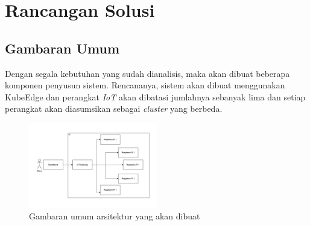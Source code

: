 \section{Rancangan Solusi}
\label{sec:rancangan-solusi}

\subsection{Gambaran Umum}
Dengan segala kebutuhan yang sudah dianalisis, maka akan dibuat beberapa komponen penyusun sistem. Rencananya, sistem  akan dibuat menggunakan KubeEdge dan perangkat \textit{IoT} akan dibatasi jumlahnya sebanyak lima dan setiap perangkat akan diasumsikan sebagai \textit{cluster} yang berbeda.

\begin{figure}[h]
  \centering
  \includegraphics[width=0.5\textwidth]{resources/chapter-3/gambaran-umum-arsitektur.jpg}
  \caption{Gambaran umum arsitektur yang akan dibuat}
  \label{fig:gambaran-umum-arsitektur}
\end{figure}
